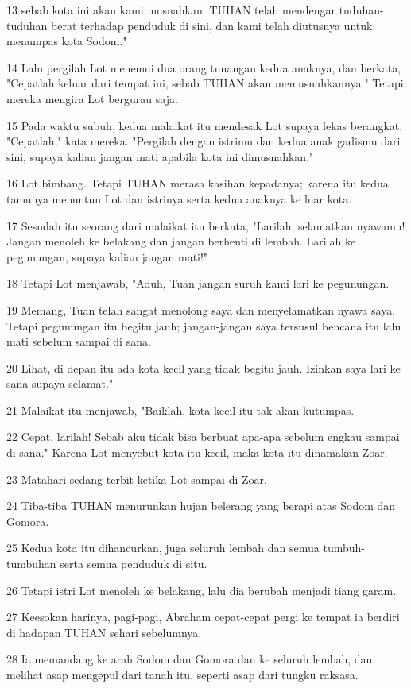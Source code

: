 \par 13 sebab kota ini akan kami musnahkan. TUHAN telah mendengar tuduhan-tuduhan berat terhadap penduduk di sini, dan kami telah diutusnya untuk menumpas kota Sodom."
\par 14 Lalu pergilah Lot menemui dua orang tunangan kedua anaknya, dan berkata, "Cepatlah keluar dari tempat ini, sebab TUHAN akan memusnahkannya." Tetapi mereka mengira Lot bergurau saja.
\par 15 Pada waktu subuh, kedua malaikat itu mendesak Lot supaya lekas berangkat. "Cepatlah," kata mereka. "Pergilah dengan istrimu dan kedua anak gadismu dari sini, supaya kalian jangan mati apabila kota ini dimusnahkan."
\par 16 Lot bimbang. Tetapi TUHAN merasa kasihan kepadanya; karena itu kedua tamunya menuntun Lot dan istrinya serta kedua anaknya ke luar kota.
\par 17 Sesudah itu seorang dari malaikat itu berkata, "Larilah, selamatkan nyawamu! Jangan menoleh ke belakang dan jangan berhenti di lembah. Larilah ke pegunungan, supaya kalian jangan mati!"
\par 18 Tetapi Lot menjawab, "Aduh, Tuan jangan suruh kami lari ke pegunungan.
\par 19 Memang, Tuan telah sangat menolong saya dan menyelamatkan nyawa saya. Tetapi pegunungan itu begitu jauh; jangan-jangan saya tersusul bencana itu lalu mati sebelum sampai di sana.
\par 20 Lihat, di depan itu ada kota kecil yang tidak begitu jauh. Izinkan saya lari ke sana supaya selamat."
\par 21 Malaikat itu menjawab, "Baiklah, kota kecil itu tak akan kutumpas.
\par 22 Cepat, larilah! Sebab aku tidak bisa berbuat apa-apa sebelum engkau sampai di sana." Karena Lot menyebut kota itu kecil, maka kota itu dinamakan Zoar.
\par 23 Matahari sedang terbit ketika Lot sampai di Zoar.
\par 24 Tiba-tiba TUHAN menurunkan hujan belerang yang berapi atas Sodom dan Gomora.
\par 25 Kedua kota itu dihancurkan, juga seluruh lembah dan semua tumbuh-tumbuhan serta semua penduduk di situ.
\par 26 Tetapi istri Lot menoleh ke belakang, lalu dia berubah menjadi tiang garam.
\par 27 Keesokan harinya, pagi-pagi, Abraham cepat-cepat pergi ke tempat ia berdiri di hadapan TUHAN sehari sebelumnya.
\par 28 Ia memandang ke arah Sodom dan Gomora dan ke seluruh lembah, dan melihat asap mengepul dari tanah itu, seperti asap dari tungku raksasa.
